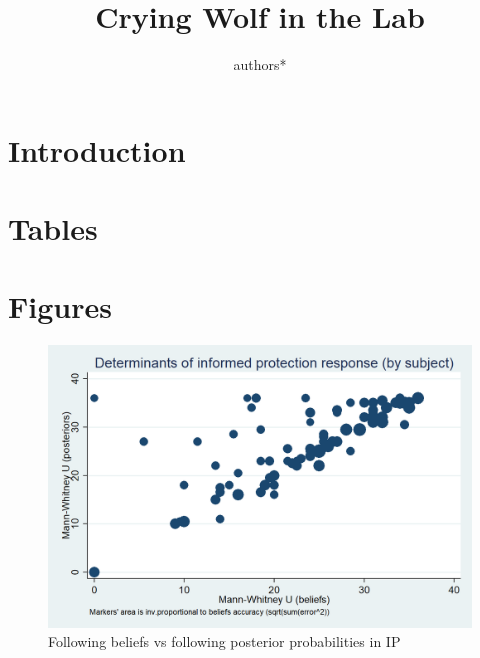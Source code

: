 \documentclass[11pt,a4paper]{article}
\title{\Large Crying Wolf in the Lab\\}
\author{\large authors*}
\begin{document}
\maketitle
\onehalfspacing
\begin{abstract}{ }


\vspace{10pt}
\begin{singlespace}

\end{singlespace}
\end{abstract}

\vspace{140pt}
\footnotesize






\onehalfspacing
\normalsize
\newpage
\section{Introduction}

\appendix


\newpage
\section{Tables}


 \label{xx}









\newpage
\section{Figures}



\begin{figure}[!htbp]
\caption{Following beliefs vs following posterior probabilities in IP} \label{ref_question}
\centering
\includegraphics[scale=0.4]{Graphs/clustering.png}
\end{figure}
\end{document}
